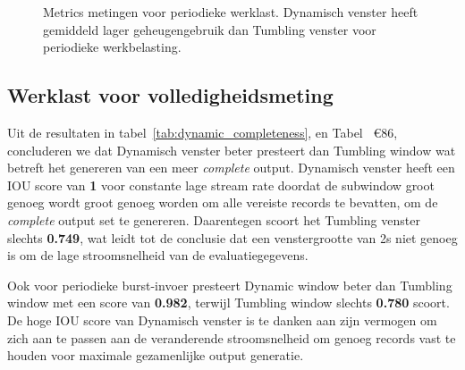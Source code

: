 \begin{figure}
    \caption[Metriek metingen voor periodieke werklast]
    {Metrics metingen voor periodieke werklast. Dynamisch venster 
    heeft gemiddeld lager geheugengebruik dan Tumbling venster voor
periodieke werkbelasting. }%
    \label{fig:periodic_measurement}
\end{figure}

\subsection{Werklast voor volledigheidsmeting}%
\label{sec:Workload for completeness measure}

Uit de resultaten in tabel~\ref{tab:dynamic_completeness}, en 
Tabel ~€86, concluderen we dat Dynamisch venster 
beter presteert dan Tumbling window wat betreft het genereren van een meer \emph{complete} output. 
Dynamisch venster heeft een IOU score van \textbf{1} voor constante lage stream rate
doordat de subwindow groot genoeg wordt 
groot genoeg worden om alle vereiste records te bevatten, om de \emph{complete} output set te genereren. Daarentegen scoort het Tumbling venster slechts \textbf{0.749}, wat leidt tot 
de conclusie dat een venstergrootte van 2s niet genoeg is om de lage stroomsnelheid 
van de evaluatiegegevens. 

Ook voor periodieke burst-invoer presteert Dynamic window beter dan Tumbling window met een
score van \textbf{0.982}, terwijl Tumbling window slechts \textbf{0.780} scoort. De hoge IOU 
score van Dynamisch venster is te danken aan zijn vermogen  
om zich aan te passen aan de veranderende stroomsnelheid om genoeg 
records vast te houden voor maximale gezamenlijke output generatie.


\begin{table}[htbp]
    \centering
\caption{Dynamisch venster meting van volledigheid.}
\label{tab:dynamic_completeness}
\end{table}

\begin{table}[htbp]
    \centering
\caption{Tumbling window's completeness measurement. }
\label{tab:tumbling_completeness}
\end{table}


